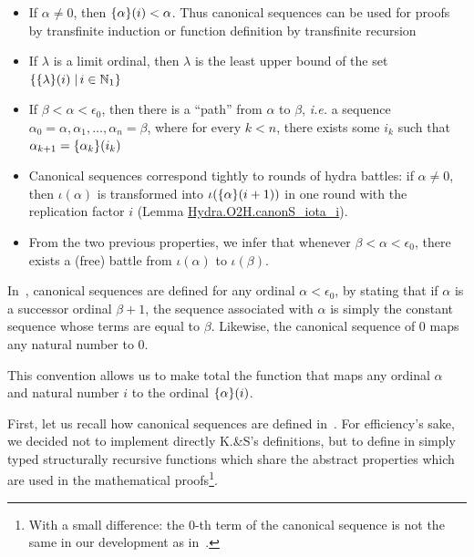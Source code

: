 \documentclass[a4paper]{book}
\begin{document}
\begin{itemize}
\item If $\alpha\not=0$, then $\mbox{$\{\alpha\}(i)$}<\alpha$. Thus canonical sequences can be used for proofs by transfinite induction or function definition by transfinite recursion
\item If $\lambda$ is a limit ordinal, then $\lambda$ is the least upper bound of the set 
$\{\mbox{$\{\lambda\}(i)$}\;|\,i\in\mathbb{N}_1\}$


\item If $\beta<\alpha<\epsilon_0$, then there is a ``path'' from $\alpha$ to $\beta$, \emph{i.e.} a
sequence $\alpha_0=\alpha, \alpha_1, \dots, \alpha_n=\beta$, where for every $k<n$, there exists some $i_k$ such that $\alpha_{k+1}=\mbox{$\{\alpha_k\}(i_k)$}$
\item Canonical sequences correspond tightly to rounds of hydra battles: if $\alpha\not=0$,
then $\iota(\alpha)$ is transformed into $\iota(\mbox{$\{\alpha\}(i+1)$})$ in one round with
the replication factor $i$ (Lemma \href{../src/html/hydras.Hydra.O2H.html\#canonS_iota_i}{Hydra.O2H.canonS\_iota\_i}).
\item From the two previous properties, we infer that whenever $\beta<\alpha<\epsilon_0$, there exists a (free) battle from $\iota(\alpha)$ to $\iota(\beta)$.
\end{itemize}

\begin{remark}
  In~\cite{KS81}, canonical sequences are defined for any ordinal $\alpha <\epsilon_0$,
by stating that if $\alpha$ is a successor ordinal $\beta+1$,  the sequence associated with 
$\alpha$ is simply the constant sequence whose terms are equal to $\beta$.
Likewise, the canonical sequence of $0$ maps any natural number to $0$.

This convention allows us to make total the function that maps any ordinal $\alpha$ and natural number $i$ to the ordinal $\mbox{$\{\alpha\}(i)$}$.

\end{remark}


First, let us recall how canonical sequences are defined in~\cite{KS81}. For efficiency's sake, we decided not to implement directly K.\&S's definitions, but to define in \gallina{} simply typed structurally recursive functions which share the abstract properties which are used in the mathematical proofs\footnote{With a small difference: the $0$-th term of the canonical sequence is not the same in our development as in~\cite{KS81}.}.
\end{document}
